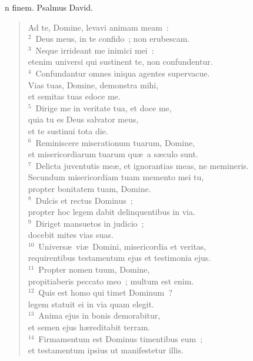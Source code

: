 \bchapter
{}n finem. Psalmus David. \begin{flushleft}\begin{verse}\vspace{6pt}Ad te, Domine, levavi animam meam~:\\
${}^{2}$~Deus meus, in te confido~; non erubescam.\\
${}^{3}$~Neque irrideant me inimici mei~:\\ etenim universi qui sustinent te, non confundentur.\\
${}^{4}$~Confundantur omnes iniqua agentes supervacue.\\ Vias tuas, Domine, demonstra mihi,\\ et semitas tuas edoce me.\\
${}^{5}$~Dirige me in veritate tua, et doce me,\\ quia tu es Deus salvator meus,\\ et te sustinui tota die.\\
${}^{6}$~Reminiscere miserationum tuarum, Domine,\\ et misericordiarum tuarum qu\ae\ a s\ae culo sunt.\\
${}^{7}$~Delicta juventutis me\ae , et ignorantias meas, ne memineris.\\ Secundum misericordiam tuam memento mei tu,\\ propter bonitatem tuam, Domine.\\
${}^{8}$~Dulcis et rectus Dominus~;\\ propter hoc legem dabit delinquentibus in via.\\
${}^{9}$~Diriget mansuetos in judicio~;\\ docebit mites vias suas.\\
${}^{10}$~Univers\ae\ vi\ae\ Domini, misericordia et veritas,\\ requirentibus testamentum ejus et testimonia ejus.\\
${}^{11}$~Propter nomen tuum, Domine,\\ propitiaberis peccato meo~; multum est enim.\\
${}^{12}$~Quis est homo qui timet Dominum~?\\ legem statuit ei in via quam elegit.\\
${}^{13}$~Anima ejus in bonis demorabitur,\\ et semen ejus h\ae reditabit terram.\\
${}^{14}$~Firmamentum est Dominus timentibus eum~;\\ et testamentum ipsius ut manifestetur illis.\\

\end{verse}
\end{flushleft}
